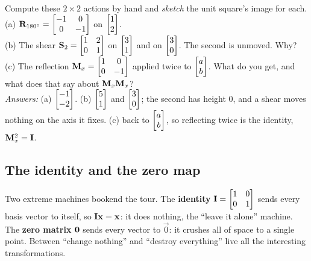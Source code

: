 \begin{labbox}
Compute these $2\times 2$ actions by hand and \emph{sketch} the unit square's
image for each. \\[0.3em]
(a) $\mathbf{R}_{180^\circ} = \begin{bmatrix} -1 & 0 \\ 0 & -1\end{bmatrix}$ on
$\begin{bmatrix}1\\2\end{bmatrix}$. \\
(b) The shear $\mathbf{S}_2 = \begin{bmatrix} 1 & 2 \\ 0 & 1\end{bmatrix}$ on
$\begin{bmatrix}3\\1\end{bmatrix}$ and on $\begin{bmatrix}3\\0\end{bmatrix}$. The second is unmoved. Why? \\
(c) The reflection $\mathbf{M}_x = \begin{bmatrix} 1 & 0 \\ 0 & -1\end{bmatrix}$
applied twice to $\begin{bmatrix}a\\b\end{bmatrix}$. What do you get, and what does that say about
$\mathbf{M}_x\mathbf{M}_x$? \\[0.3em]
\emph{Answers:} (a) $\begin{bmatrix}-1\\-2\end{bmatrix}$. (b) $\begin{bmatrix}5\\1\end{bmatrix}$ and $\begin{bmatrix}3\\0\end{bmatrix}$;
the second has height $0$, and a shear moves nothing on the axis it fixes. (c)
back to $\begin{bmatrix}a\\b\end{bmatrix}$, so reflecting twice is the identity, $\mathbf{M}_x^2 =
\mathbf{I}$.
\end{labbox}

\subsection{The identity and the zero map}
\label{ch05:identity-zero}

Two extreme machines bookend the tour. The \textbf{identity}
$\mathbf{I} = \begin{bmatrix} 1 & 0 \\ 0 & 1\end{bmatrix}$ sends every basis vector
to itself, so $\mathbf{I}\mathbf{x} = \mathbf{x}$: it does nothing, the ``leave it alone''
machine. The \textbf{zero matrix} $\mathbf{0}$ sends every vector to $\vec{0}$: it
crushes all of space to a single point. Between ``change nothing'' and ``destroy
everything'' live all the interesting transformations.

